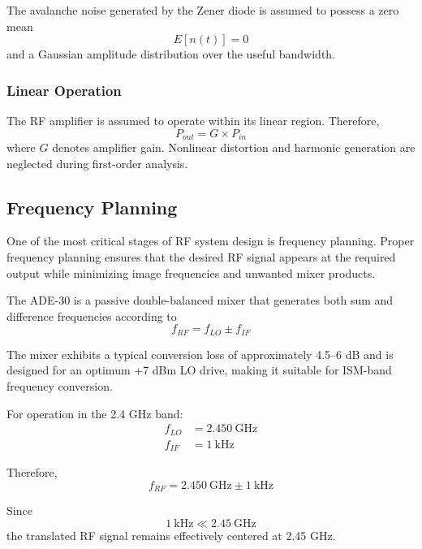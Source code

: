 \documentclass[12pt,a4paper]{report}
\begin{document}
	The avalanche noise generated by the Zener diode is assumed to possess a zero mean
	\begin{equation}
		E[n(t)] = 0
	\end{equation}
	and a Gaussian amplitude distribution over the useful bandwidth.
	
	\subsubsection*{Linear Operation}
	
	The RF amplifier is assumed to operate within its linear region. Therefore,
	\begin{equation}
		P_{out} = G \times P_{in}
	\end{equation}
	where $G$ denotes amplifier gain. Nonlinear distortion and harmonic generation are neglected during first-order analysis.
	
		
	\subsection{Frequency Planning}
	One of the most critical stages of RF system design is frequency planning. Proper frequency planning ensures that the desired RF signal appears at the required output while minimizing image frequencies and unwanted mixer products.
	
	The ADE-30 is a passive double-balanced mixer that generates both sum and difference frequencies according to
	\begin{equation}
		f_{RF} = f_{LO} \pm f_{IF}
	\end{equation}
	
	The mixer exhibits a typical conversion loss of approximately 4.5--6 dB and is designed for an optimum +7 dBm LO drive, making it suitable for ISM-band frequency conversion.
	
	For operation in the 2.4 GHz band:
	\begin{align*}
		f_{LO} &= 2.450\ \text{GHz} \\
		f_{IF} &= 1\ \text{kHz}
	\end{align*}
	
	Therefore,
	\begin{equation}
		f_{RF} = 2.450\ \text{GHz} \pm 1\ \text{kHz}
	\end{equation}
	
	Since
	\begin{equation}
		1\ \text{kHz} \ll 2.45\ \text{GHz}
	\end{equation}
	the translated RF signal remains effectively centered at 2.45 GHz.
	
\end{document}
